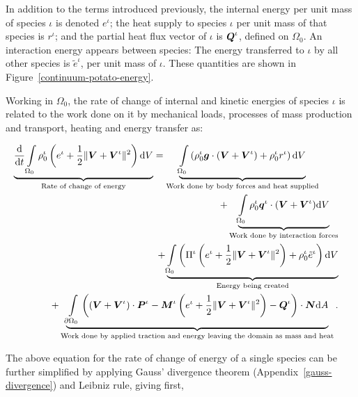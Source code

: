 In addition to the terms introduced previously, the internal energy
per unit mass of species $\iota$ is denoted $e^\iota$; the heat supply
to species $\iota$ per unit mass of that species is $r^\iota$; and the
partial heat flux vector of $\iota$ is $\mbox{\boldmath$ Q$}^\iota$, defined on
$\Omega_0$. An interaction energy appears between species: The energy
transferred to $\iota$ by all other species is $\tilde{e}^\iota$, per
unit mass of $\iota$. These quantities are shown in
Figure~\ref{continuum-potato-energy}.

Working in $\Omega_0$, the rate of change of internal and kinetic
energies of species $\iota$ is related to the work done on it by
mechanical loads, processes of mass production and transport, heating
and energy transfer as:

\begin{eqnarray}
\underbrace{\frac{\mathrm{d}}{\mathrm{d}t}
  \int\limits_{\Omega_0}\rho_0^\iota 
\left ( e^\iota + \frac{1}{2} \Vert\mbox{\boldmath$ V$}+\mbox{\boldmath$ V$}^\iota\Vert^2 \right )
\mathrm{d}V}_{\text{Rate of change of energy}} =
\underbrace{\int\limits_{\Omega_0} \left(\rho_0^\iota\mbox{\boldmath$ g$} 
\cdot\left(\mbox{\boldmath$ V$}+\mbox{\boldmath$ V$}^\iota\right) + \rho_0^\iota r^\iota
\right)\mathrm{d}V}_{\text{Work done by body forces and heat
    supplied}}\qquad& &\nonumber\\ 
+\underbrace{\int\limits_{\Omega_0} \rho_0^\iota\mbox{\boldmath$ q$}^\iota\cdot(\mbox{\boldmath$ V$} +
  \mbox{\boldmath$ V$}^\iota) \mathrm{d}V}_{\text{Work done by interaction forces}}&
&\nonumber\\ 
+ \underbrace{\int\limits_{\Omega_0} \left(\Pi^\iota\left(e^\iota +
\frac{1}{2}\Vert\mbox{\boldmath$ V$}+\mbox{\boldmath$ V$}^\iota\Vert^2\right) +
\rho^\iota_0\tilde{e}^\iota\right)\mathrm{d}V}_{\text{Energy being created}} 
& & \nonumber \\ 
+ \underbrace{\int\limits_{\partial \Omega_0}
  \left(\left(\mbox{\boldmath$ V$}+\mbox{\boldmath$ V$}^\iota\right)\cdot\mbox{\boldmath$ P$}^\iota - 
\mbox{\boldmath$ M$}^\iota\left(e^\iota +\frac{1}{2}
\Vert\mbox{\boldmath$ V$}+\mbox{\boldmath$ V$}^\iota\Vert^2\right) -
\mbox{\boldmath$ Q$}^\iota\right)\cdot\mbox{\boldmath$ N$}\mathrm{d}A}_{\text{Work done by applied
    traction and energy leaving the domain as mass and heat}}.
\label{globalbalanceofenergy}
\end{eqnarray}

The above equation for the rate of change of energy of a single
species can be further simplified by applying Gauss' divergence
theorem (Appendix~\ref{gauss-divergence}) and Leibniz rule, giving
first,

